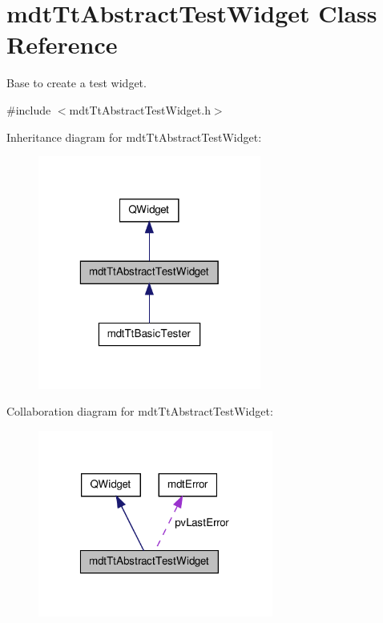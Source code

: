 \hypertarget{classmdt_tt_abstract_test_widget}{\section{mdt\-Tt\-Abstract\-Test\-Widget Class Reference}
\label{classmdt_tt_abstract_test_widget}
}


Base to create a test widget.  




{\ttfamily \#include $<$mdt\-Tt\-Abstract\-Test\-Widget.\-h$>$}



Inheritance diagram for mdt\-Tt\-Abstract\-Test\-Widget\-:
\nopagebreak
\begin{figure}[H]
\begin{center}
\leavevmode
\includegraphics[width=208pt]{classmdt_tt_abstract_test_widget__inherit__graph}
\end{center}
\end{figure}


Collaboration diagram for mdt\-Tt\-Abstract\-Test\-Widget\-:
\nopagebreak
\begin{figure}[H]
\begin{center}
\leavevmode
\includegraphics[width=219pt]{classmdt_tt_abstract_test_widget__coll__graph}
\end{center}
\end{figure}
